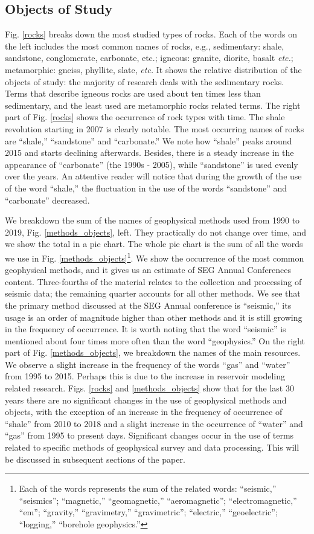 \documentclass[geosciences,article,submit,moreauthors,pdftex]{Definitions/mdpi}
\begin{document}
\subsection{Objects of  Study}
Fig. \ref{rocks} breaks down the most studied types of rocks. Each of the words on the left includes the most common names of rocks, e.g., sedimentary: shale, sandstone, conglomerate, carbonate, etc.; igneous: granite, diorite, basalt \textit{etc.}; metamorphic: gneiss, phyllite, slate, \textit{etc.} It shows the relative distribution of the objects of study: the majority of research deals with the sedimentary rocks. Terms that describe igneous rocks are used about ten times less than sedimentary, and the least used are metamorphic rocks related terms. The right part of Fig. \ref{rocks} shows the occurrence of rock types with time. The shale revolution starting in 2007 is clearly notable. The most occurring names of rocks are ``shale,'' ``sandstone'' and ``carbonate.'' We note how ``shale'' peaks around 2015 and starts declining afterwards. Besides, there is a steady increase in the appearance of ``carbonate'' (the 1990s - 2005), while ``sandstone'' is used evenly over the years. An attentive reader will notice that during the growth of the use of the word ``shale,'' the fluctuation in the use of the words ``sandstone'' and ``carbonate'' decreased.


We breakdown the sum of the names of geophysical methods used from 1990 to 2019, Fig. \ref{methods_objects}, left. They practically do not change over time, and we show the total in a pie chart. The whole pie chart is the sum of all the words we use in Fig. \ref{methods_objects}\footnote{Each of the words represents the sum of the related words: ``seismic,'' ``seismics''; ``magnetic,'' ``geomagnetic,'' ``aeromagnetic''; ``electromagnetic,'' ``em''; ``gravity,'' ``gravimetry,'' ``gravimetric''; ``electric,'' ``geoelectric''; ``logging,'' ``borehole geophysics.''}. We show the occurrence of the most common geophysical methods, and it gives us an estimate of SEG Annual Conferences content. Three-fourths of the material relates to the collection and processing of seismic data; the remaining quarter accounts for all other methods. We see that the primary method discussed at the SEG Annual conference is ``seismic,'' its usage is an order of magnitude higher than other methods and it is still growing in the frequency of occurrence. It is worth noting that the word ``seismic'' is mentioned about four times more often than the word ``geophysics.'' On the right part of Fig. \ref{methods_objects}, we breakdown the names of the main resources. We observe a slight increase in the frequency of the words ``gas'' and ``water'' from 1995 to 2015. Perhaps this is due to the increase in reservoir modeling related research. 
Figs. \ref{rocks} and \ref{methods_objects} show that for the last 30 years there are no significant changes in the use of geophysical methods and objects, with the exception of an increase in the frequency of occurrence of ``shale'' from 2010 to 2018 and a slight increase in the occurrence of ``water'' and ``gas'' from 1995 to present days.
Significant changes occur in the use of terms related to specific methods of geophysical survey and data processing. This will be discussed in subsequent sections of the paper.
\end{document}
